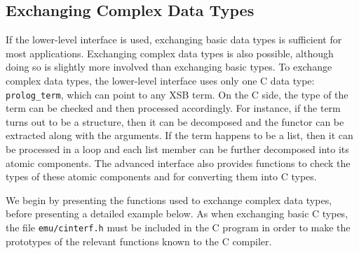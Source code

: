 \subsection{Exchanging Complex Data Types}
\label{extern_c2p_p2p_p2c}

If the lower-level interface is used, exchanging basic data types is
sufficient for most applications.  Exchanging complex data types is
also possible, although doing so is slightly more involved than
exchanging basic types.  To exchange complex data types, the
lower-level interface uses only one C data type: {\tt prolog\_term},
which can point to any XSB term.  On the C side, the type of the term
can be checked and then processed accordingly.  For instance, if the
term turns out to be a structure, then it can be decomposed and the
functor can be extracted along with the arguments.  If the term
happens to be a list, then it can be processed in a loop and each list
member can be further decomposed into its atomic components.  The
advanced interface also provides functions to check the types of these
atomic components and for converting them into C types.

We begin by presenting the functions used to exchange complex data
types, before presenting a detailed example below.  As when exchanging
basic C types, the file {\tt emu/cinterf.h} must be included in the C
program in order to make the prototypes of the relevant functions
known to the C compiler.

